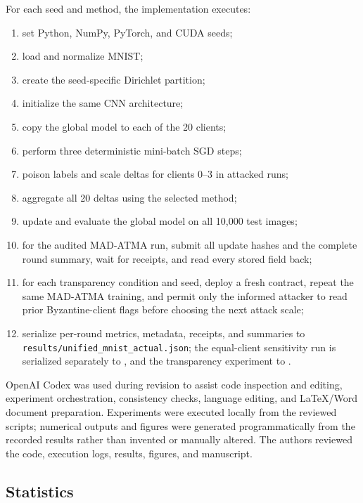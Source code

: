 \documentclass[10pt,letterpaper]{article}
\begin{document}
For each seed and method, the implementation executes:
\begin{enumerate}[leftmargin=*]
    \item set Python, NumPy, PyTorch, and CUDA seeds;
    \item load and normalize MNIST;
    \item create the seed-specific Dirichlet partition;
    \item initialize the same CNN architecture;
    \item copy the global model to each of the 20 clients;
    \item perform three deterministic mini-batch SGD steps;
    \item poison labels and scale deltas for clients 0--3 in attacked runs;
    \item aggregate all 20 deltas using the selected method;
    \item update and evaluate the global model on all 10,000 test images;
    \item for the audited MAD-ATMA run, submit all update hashes and the complete
    round summary, wait for receipts, and read every stored field back;
    \item for each transparency condition and seed, deploy a fresh contract,
    repeat the same MAD-ATMA training, and permit only the informed attacker to
    read prior Byzantine-client flags before choosing the next attack scale;
    \item serialize per-round metrics, metadata, receipts, and summaries to
    \texttt{results/unified\_mnist\_actual.json}; the equal-client sensitivity
    run is serialized separately to
    , and the
    transparency experiment to
    .
\end{enumerate}

OpenAI Codex was used during revision to assist code inspection and editing,
experiment orchestration, consistency checks, language editing, and LaTeX/Word
document preparation. Experiments were executed locally from the reviewed
scripts; numerical outputs and figures were generated programmatically from the
recorded results rather than invented or manually altered. The authors reviewed
the code, execution logs, results, figures, and manuscript.

\subsection{Statistics}
\end{document}
